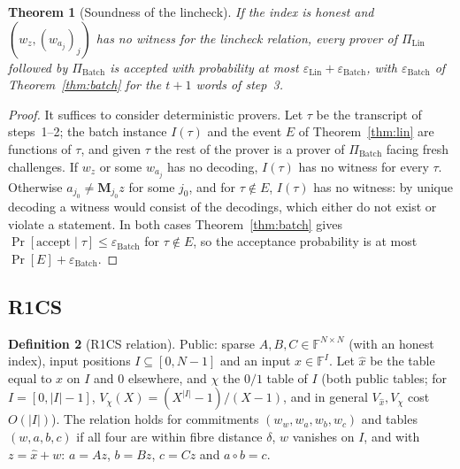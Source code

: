 \documentclass[11pt]{article}
\newtheorem{theorem}{Theorem}
\theoremstyle{definition}
\newtheorem{definition}[theorem]{Definition}
\newcommand{\F}{\mathbb{F}}
\newcommand{\iv}[2]{[#1,#2]}
\begin{document}
\begin{theorem}[Soundness of the lincheck]\label{thm:linsound}
If the index is honest and $(w_z,(w_{a_j})_j)$ has no witness for the lincheck relation, every prover of $\Pi_{\mathrm{Lin}}$ followed by $\Pi_{\mathrm{Batch}}$ is accepted with probability at most $\varepsilon_{\mathrm{Lin}}+\varepsilon_{\mathrm{Batch}}$, with $\varepsilon_{\mathrm{Batch}}$ of Theorem~\ref{thm:batch} for the $t+1$ words of step~3.
\end{theorem}
\begin{proof}
It suffices to consider deterministic provers. Let $\tau$ be the transcript of steps~1--2; the batch instance $I(\tau)$ and the event $E$ of Theorem~\ref{thm:lin} are functions of $\tau$, and given $\tau$ the rest of the prover is a prover of $\Pi_{\mathrm{Batch}}$ facing fresh challenges.
If $w_z$ or some $w_{a_j}$ has no decoding, $I(\tau)$ has no witness for every $\tau$. Otherwise $a_{j_0}\ne\mathbf M_{j_0}z$ for some $j_0$, and for $\tau\notin E$, $I(\tau)$ has no witness: by unique decoding a witness would consist of the decodings, which either do not exist or violate a statement.
In both cases Theorem~\ref{thm:batch} gives $\Pr[\text{accept}\mid\tau]\le\varepsilon_{\mathrm{Batch}}$ for $\tau\notin E$, so the acceptance probability is at most $\Pr[E]+\varepsilon_{\mathrm{Batch}}$.
\end{proof}

\subsection{R1CS}

\begin{definition}[R1CS relation]
Public: sparse $A,B,C\in\F^{N\times N}$ (with an honest index), input positions $I\subseteq\iv0{N-1}$ and an input $x\in\F^I$. Let $\hat x$ be the table equal to $x$ on $I$ and $0$ elsewhere, and $\chi$ the $0/1$ table of $I$ (both public tables; for $I=\iv0{|I|-1}$, $V_\chi(X)=(X^{|I|}-1)/(X-1)$, and in general $V_{\hat x},V_\chi$ cost $O(|I|)$).
The relation holds for commitments $(w_w,w_a,w_b,w_c)$ and tables $(w,a,b,c)$ if all four are within fibre distance $\delta$, $w$ vanishes on $I$, and with $z=\hat x+w$: $a=Az$, $b=Bz$, $c=Cz$ and $a\circ b=c$.
\end{definition}
\end{document}
